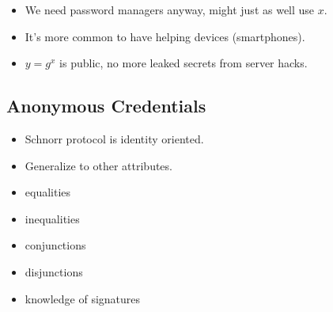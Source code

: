 \begin{frame}
  \begin{remark}
    \begin{itemize}
      \item We need password managers anyway, might just as well use \(x\).

        \pause

      \item It's more common to have helping devices (smartphones).

        \pause

      \item \(y = g^x\) is public, no more leaked secrets from server hacks.
    \end{itemize}
  \end{remark}
\end{frame}

\subsection{Anonymous Credentials}

\begin{frame}
  \begin{idea}
    \begin{itemize}
      \item Schnorr protocol is identity oriented.
      \item Generalize to other attributes.
    \end{itemize}
  \end{idea}
\end{frame}

\begin{frame}
  \begin{example}
    \begin{itemize}
      \item equalities
      \item inequalities
      \item conjunctions
      \item disjunctions
      \item knowledge of signatures
    \end{itemize}
  \end{example}
\end{frame}

